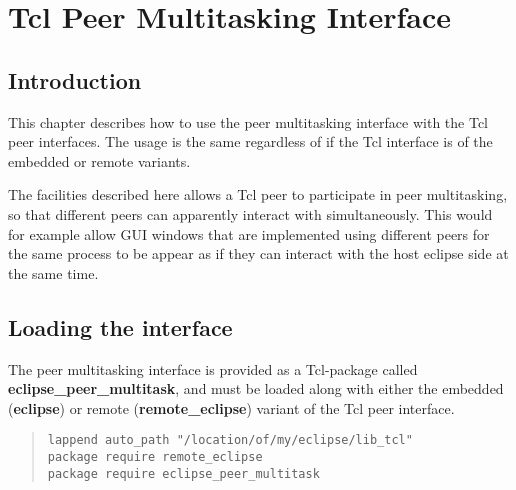 %
% 
% 
% 
% 
%
%
%
\chapter{Tcl Peer Multitasking Interface}
\label{chaptclmulti}

\section{Introduction}

This chapter describes how to use the peer multitasking interface with 
the Tcl peer interfaces. The usage is the same regardless of if the Tcl
interface is of the embedded or remote variants.

The facilities described here allows a Tcl peer to participate in peer
multitasking,  so that different peers can apparently interact with
{\eclipse} simultaneously. This would for example allow GUI windows that
are implemented using different peers for the same {\eclipse} process to be
appear as if they can interact with the host {eclipse} side at the same
time.

\section{Loading the interface}
The peer multitasking interface is provided as a Tcl-package called {\bf
eclipse_peer_multitask}, and must be loaded along with either the embedded
({\bf eclipse})  or remote ({\bf remote_eclipse}) variant of the Tcl peer
interface. 
\begin{quote}\begin{verbatim}
lappend auto_path "/location/of/my/eclipse/lib_tcl"
package require remote_eclipse
package require eclipse_peer_multitask
\end{verbatim}\end{quote}

